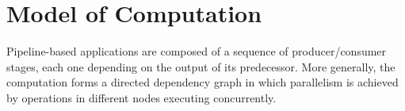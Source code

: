 \documentclass[runningheads,a4paper]{llncs}
\begin{document}










\section{Model of Computation}

Pipeline-based applications are composed of a sequence
of producer/consumer stages, each one depending on the output of its
predecessor. More generally, the computation forms a directed
dependency graph in which parallelism is achieved by operations in
different nodes executing concurrently.
\end{document}

